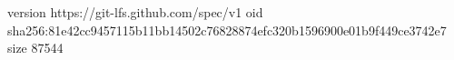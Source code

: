 version https://git-lfs.github.com/spec/v1
oid sha256:81e42cc9457115b11bb14502c76828874efc320b1596900e01b9f449ce3742e7
size 87544
